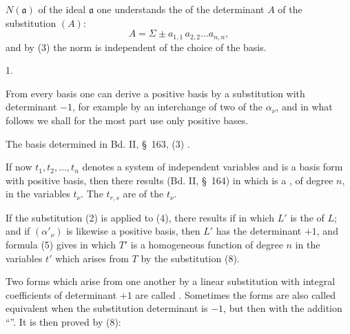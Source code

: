 
 $N(\mathfrak{a})$ of the ideal $\mathfrak{a}$ one understands the
 of the determinant $A$ of the substitution $(A)$:
\[
A = \Sigma \pm a_{1,1}\,a_{2,2}\ldots a_{n,n},
\]
and by (3) the norm is independent of the choice of the basis.

1. 

From every basis one can derive a positive basis by a substitution with
determinant $-1$, for example by an interchange of two of the $\alpha_\nu$, and
in what follows we shall for the most part use only
positive bases.

The basis determined in Bd. II, \S\ 163, (3) .

If now $t_1, t_2, \ldots, t_n$ denotes a system of independent variables and
is a basis form with positive basis, then there results (Bd. II, \S\ 164)
in which
is a , of degree $n$, in the
variables $t_\nu$. The $t_{r,s}$ are  of the $t_\nu$.

If the substitution (2) is applied to (4), there results
if
in which $L'$ is the  of $L$; and if
$(\alpha'_\nu)$ is likewise a positive basis, then $L'$ has the
determinant $+1$, and formula (5) gives
in which $T'$ is a homogeneous function of degree $n$ in the variables $t'$
which arises from $T$ by the substitution (8).

Two forms which arise from one another by a linear substitution with integral
coefficients of determinant $+1$ are called . Sometimes the forms are also
called equivalent when the substitution determinant is $-1$, but then
with the addition ``''. It is then proved by (8):
